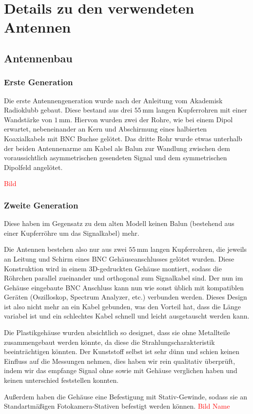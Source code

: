 \documentclass[titlepage,11pt,a4paper,ngerman]{article}
\begin{document}
\section{Details zu den verwendeten Antennen}

\subsection{Antennenbau}
\subsubsection{Erste Generation}
Die erste Antennengeneration wurde nach der Anleitung vom Akademisk Radioklubb gebaut. Diese bestand aus drei $55\,$mm langen Kupferrohren mit einer Wandstärke von $1\,$mm. Hiervon wurden zwei der Rohre, wie bei einem Dipol erwartet, nebeneinander an Kern und Abschirmung eines halbierten Koaxialkabels mit BNC Buchse gelötet. Das dritte Rohr wurde etwas unterhalb der beiden Antennenarme am Kabel als Balun zur Wandlung zwischen dem voraussichtlich asymmetrischen gesendeten Signal und dem symmetrischen Dipolfeld angelötet.

\textcolor{red}{Bild}

\subsubsection{Zweite Generation}

 Diese haben im Gegensatz zu dem alten Modell keinen Balun (bestehend aus einer Kupferröhre um das Signalkabel) mehr.\par
Die Antennen bestehen also nur aus zwei $55\,$mm langen Kupferrohren, die jeweils an Leitung und Schirm eines BNC Gehäuseanschlusses gelötet wurden. Diese Konstruktion wird in einem 3D-gedruckten Gehäuse montiert, sodass die Röhrchen parallel zueinander und orthogonal zum Signalkabel sind. Der nun im Gehäuse eingebaute BNC Anschluss kann nun wie sonst üblich mit kompatiblen Geräten (Oszilloskop, Spectrum Analyzer, etc.) verbunden werden. Dieses Design ist also nicht mehr an ein Kabel gebunden, was den Vorteil hat, dass die Länge variabel ist und ein schlechtes Kabel schnell und leicht ausgetauscht werden kann.\par
Die Plastikgehäuse wurden absichtlich so designet, dass sie ohne Metallteile zusammengebaut werden könnte, da diese die Strahlungscharakteristik beeinträchtigen könnten. Der Kunststoff selbst ist sehr dünn und schien keinen Einfluss auf die Messungen nehmen, dies haben wir rein qualitativ überprüft, indem wir das empfange Signal ohne sowie mit Gehäuse verglichen haben und keinen unterschied feststellen konnten.\par
Außerdem haben die Gehäuse eine Befestigung mit Stativ-Gewinde, sodass sie an Standartmäßigen Fotokamera-Stativen befestigt werden können.
\textcolor{red}{Bild Name}
\end{document}
